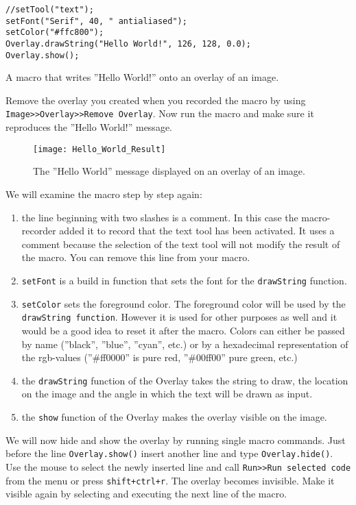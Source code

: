 \begin{listing}[H]
\begin{verbatim}
//setTool("text");
setFont("Serif", 40, " antialiased");
setColor("#ffc800");
Overlay.drawString("Hello World!", 126, 128, 0.0);
Overlay.show();
\end{verbatim}
\caption{A macro that writes ''Hello World!'' onto an overlay of an image.}
\label{lst:hello_world_image}
\end{listing}

Remove the overlay you created when you recorded the macro by using {\tt Image>>Overlay>>Remove Overlay}. Now run the macro and make sure it reproduces the ''Hello World!'' message.

\begin{figure}[h!]
  \centering
    \texttt{[image: Hello\_World\_Result]}
    \caption[A text displayed on an image]{The ''Hello World'' message displayed on an overlay of an image.}
    \label{hello_world_result}
\end{figure}

We will examine the macro step by step again:
\begin{enumerate}
\item the line beginning with two slashes is a comment. In this case the macro-recorder added it to record that the text tool has been activated. It uses a comment because the selection of the text tool will not modify the result of the macro. You can remove this line from your macro.
\item {\tt setFont} is a build in function that sets the font for the {\tt drawString} function.
\item {\tt setColor} sets the foreground color. The foreground color will be used by the {\tt drawString function}. However it is used for other purposes as well and it would be a good idea to reset it after the macro. Colors can either be passed by name (''black'', ''blue'', ''cyan'', etc.) or by a hexadecimal representation of the rgb-values (''\#ff0000'' is pure red, ''\#00ff00'' pure green, etc.)  
\item the {\tt drawString} function of the Overlay takes the string to draw, the location on the image and the angle in which the text will be drawn as input.
\item the {\tt show} function of the Overlay makes the overlay visible on the image.
\end{enumerate}

We will now hide and show the overlay by running single macro commands. Just before the line {\tt Overlay.show()} insert another line and type {\tt Overlay.hide()}. Use the mouse to select the newly inserted line and call {\tt Run>>Run selected code} from the menu or press {\tt shift+ctrl+r}. The overlay becomes invisible. Make it visible again by selecting and executing the next line of the macro.

